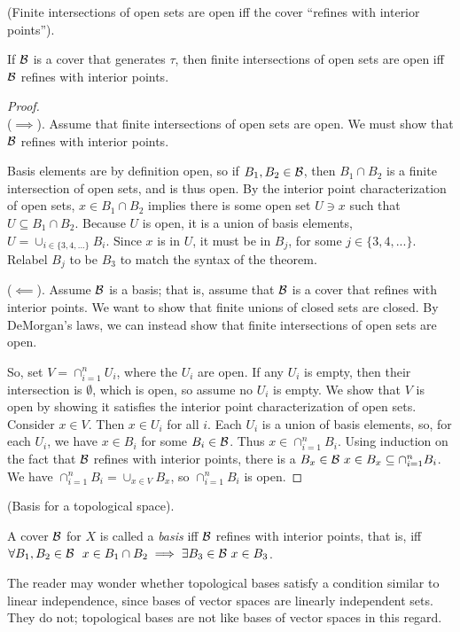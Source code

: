 \begin{theorem}
    (Finite intersections of open sets are open iff the cover ``refines with interior points'').
    
    If $\mathcal{B}$ is a cover that generates $\tau$, then finite intersections of open sets are open iff $\mathcal{B}$ refines with interior points.
\end{theorem}

\begin{proof}
    \mbox{} \\ \indent
    ($\implies$). Assume that finite intersections of open sets are open. We must show that $\mathcal{B}$ refines with interior points.
    
    Basis elements are by definition open, so if $B_1, B_2 \in \mathcal{B}$, then $B_1 \cap B_2$ is a finite intersection of open sets, and is thus open. By the interior point characterization of open sets, $x \in B_1 \cap B_2$ implies there is some open set $U \ni x$ such that $U \subseteq B_1 \cap B_2$. Because $U$ is open, it is a union of basis elements, $U = \cup_{i \in \{3, 4, ... \}} B_i$. Since $x$ is in $U$, it must be in $B_j$, for some $j \in \{3, 4, ... \}$. Relabel $B_j$ to be $B_3$ to match the syntax of the theorem.

    ($\impliedby$). Assume $\mathcal{B}$ is a basis; that is, assume that $\mathcal{B}$ is a cover that refines with interior points. We want to show that finite unions of closed sets are closed. By DeMorgan's laws, we can instead show that finite intersections of open sets are open. 

    So, set $V = \cap_{i = 1}^n U_i$, where the $U_i$ are open. If any $U_i$ is empty, then their intersection is $\emptyset$, which is open, so assume no $U_i$ is empty. We show that $V$ is open by showing it satisfies the interior point characterization of open sets. Consider $x \in V$. Then $x \in U_i$ for all $i$. Each $U_i$ is a union of basis elements, so, for each $U_i$, we have $x \in B_i$ for some $B_i \in \mathcal{B}$. Thus $x \in \cap_{i = 1}^n B_i$. Using induction on the fact that $\mathcal{B}$ refines with interior points, there is a $B_x \in \mathcal{B} \text{ } x \in B_x \subseteq \cap_{i = 1}^n B_i$. We have $\cap_{i = 1}^n B_i = \cup_{x \in V} B_x$, so $\cap_{i = 1}^n B_i$ is open.
\end{proof}

\begin{defn}
    (Basis for a topological space).
    
    A cover $\mathcal{B}$ for $X$ is called a \textit{basis} iff $\mathcal{B}$ refines with interior points, that is, iff \\ ${\forall B_1, B_2 \in \mathcal{B} \text{ } \text{ } x \in B_1 \cap B_2 \implies \exists B_3 \in \mathcal{B} \text{ } x \in B_3}$.
    
    The reader may wonder whether topological bases satisfy a condition similar to linear independence, since bases of vector spaces are linearly independent sets. They do not; topological bases are not like bases of vector spaces in this regard.
\end{defn}

